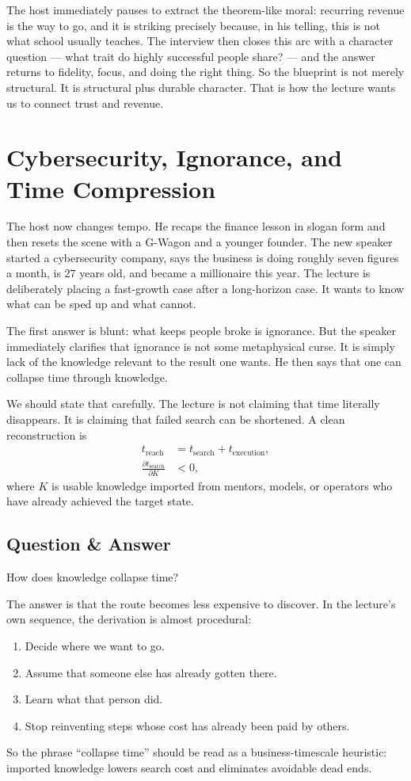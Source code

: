 The host immediately pauses to extract the theorem-like moral: recurring revenue is the way to go, and it is striking precisely because, in his telling, this is not what school usually teaches. The interview then closes this arc with a character question --- what trait do highly successful people share? --- and the answer returns to fidelity, focus, and doing the right thing. So the blueprint is not merely structural. It is structural plus durable character. That is how the lecture wants us to connect trust and revenue.

\section{Cybersecurity, Ignorance, and Time Compression}

The host now changes tempo. He recaps the finance lesson in slogan form and then resets the scene with a G-Wagon and a younger founder. The new speaker started a cybersecurity company, says the business is doing roughly seven figures a month, is \(27\) years old, and became a millionaire this year. The lecture is deliberately placing a fast-growth case after a long-horizon case. It wants to know what can be sped up and what cannot.

The first answer is blunt: what keeps people broke is ignorance. But the speaker immediately clarifies that ignorance is not some metaphysical curse. It is simply lack of the knowledge relevant to the result one wants. He then says that one can collapse time through knowledge.

We should state that carefully. The lecture is not claiming that time literally disappears. It is claiming that failed search can be shortened. A clean reconstruction is
\begin{align}
t_{\text{reach}} &= t_{\text{search}} + t_{\text{execution}}, \\
\frac{\partial t_{\text{search}}}{\partial K} &< 0,
\end{align}
where \(K\) is usable knowledge imported from mentors, models, or operators who have already achieved the target state.

\subsection{Question \& Answer}

How does knowledge collapse time?

The answer is that the route becomes less expensive to discover. In the lecture's own sequence, the derivation is almost procedural:
\begin{enumerate}
\item Decide where we want to go.
\item Assume that someone else has already gotten there.
\item Learn what that person did.
\item Stop reinventing steps whose cost has already been paid by others.
\end{enumerate}
So the phrase ``collapse time'' should be read as a business-timescale heuristic: imported knowledge lowers search cost and eliminates avoidable dead ends.

